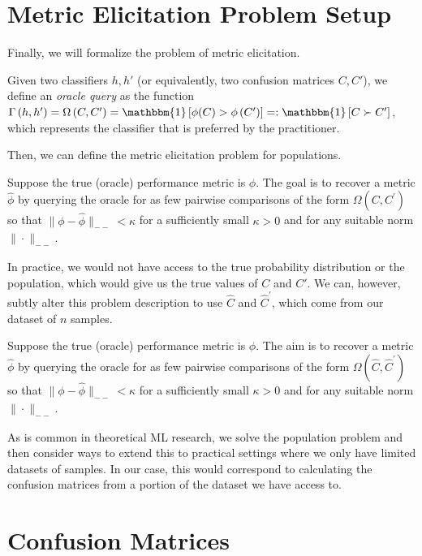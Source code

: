 \documentclass[
  letterpaper,
  numbers=noenddot,
  DIV=11,
  oneside]{scrreprt}
\theoremstyle{remark}
\begin{document}
\section{Metric Elicitation Problem Setup}\label{sec-metric-elicitation}

Finally, we will formalize the problem of metric elicitation.

Given two classifiers \(h, h'\) (or equivalently, two confusion matrices
\(C, C'\)), we define an \emph{oracle query} as the function
\(\Gamma\left(h, h^{\prime}\right)=\Omega\left(C, C^{\prime}\right)=\mathbbm{1}\left[\phi(C)>\phi\left(C^{\prime}\right)\right]=: \mathbbm{1}\left[C \succ C^{\prime}\right]\),
which represents the classifier that is preferred by the practitioner.

Then, we can define the metric elicitation problem for populations.

Suppose the true (oracle) performance metric is \(\phi\). The goal is to
recover a metric \(\hat{\phi}\) by querying the oracle for as few
pairwise comparisons of the form \(\Omega\left(C, C^{\prime}\right)\) so
that \(\|\phi-\hat{\phi}\|_{--}<\kappa\) for a sufficiently small
\(\kappa > 0\) and for any suitable norm \(\|\cdot\|_{--}\).

In practice, we would not have access to the true probability
distribution or the population, which would give us the true values of
\(C\) and \(C'\). We can, however, subtly alter this problem description
to use \(\hat{C}\) and \(\hat{C}^{\prime}\), which come from our dataset
of \(n\) samples.

Suppose the true (oracle) performance metric is \(\phi\). The aim is to
recover a metric \(\hat{\phi}\) by querying the oracle for as few
pairwise comparisons of the form
\(\Omega\left(\hat{C}, \hat{C}^{\prime}\right)\) so that
\(\|\phi-\hat{\phi}\|_{--}<\kappa\) for a sufficiently small
\(\kappa > 0\) and for any suitable norm \(\|\cdot\|_{--}\).

As is common in theoretical ML research, we solve the population problem
and then consider ways to extend this to practical settings where we
only have limited datasets of samples. In our case, this would
correspond to calculating the confusion matrices from a portion of the
dataset we have access to.

\section{Confusion Matrices}\label{sec-confusion-matrices}
\end{document}
